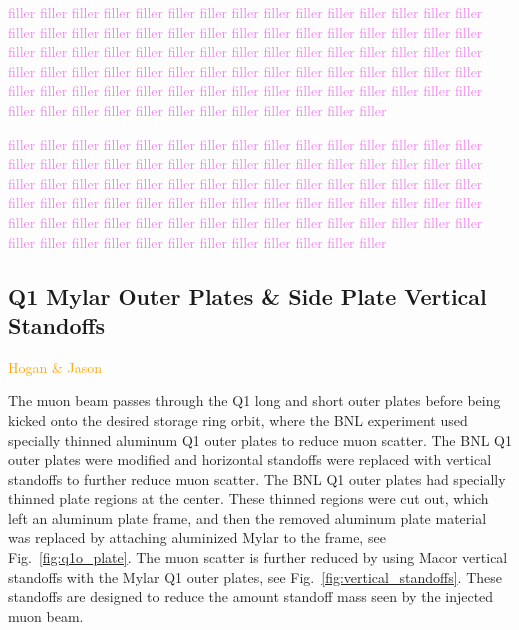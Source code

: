 \textcolor{violet}{filler filler filler filler filler filler filler filler filler filler filler filler filler filler filler filler filler filler filler filler filler filler filler filler filler filler filler filler filler filler filler filler filler filler filler filler filler filler filler filler filler filler filler filler filler filler filler filler filler filler filler filler filler filler filler filler filler filler filler filler filler filler filler filler filler filler filler filler filler filler filler filler filler filler filler filler filler filler filler filler filler filler filler filler filler filler filler}

\textcolor{violet}{filler filler filler filler filler filler filler filler filler filler filler filler filler filler filler filler filler filler filler filler filler filler filler filler filler filler filler filler filler filler filler filler filler filler filler filler filler filler filler filler filler filler filler filler filler filler filler filler filler filler filler filler filler filler filler filler filler filler filler filler filler filler filler filler filler filler filler filler filler filler filler filler filler filler filler filler filler filler filler filler filler filler filler filler filler filler filler}

\subsection{\label{sec:mylar} Q1 Mylar Outer Plates \& Side Plate Vertical Standoffs}
\textcolor{orange}{Hogan \& Jason}
\medskip

The muon beam passes through the Q1 long and short outer plates before being kicked onto the desired storage ring orbit, where the BNL experiment used specially thinned aluminum Q1 outer plates to reduce muon scatter. The BNL Q1 outer plates were modified and horizontal standoffs were replaced with vertical standoffs to further reduce muon scatter. The BNL Q1 outer plates had specially thinned plate regions at the center. These thinned regions were cut out, which left an aluminum plate frame, and then the removed aluminum plate material was replaced by attaching aluminized Mylar to the frame, see Fig.~\ref{fig:q1o_plate}. The muon scatter is further reduced by using Macor vertical standoffs with the Mylar Q1 outer plates, see Fig.~\ref{fig:vertical_standoffs}. These standoffs are designed to reduce the amount standoff mass seen by the injected muon beam.

